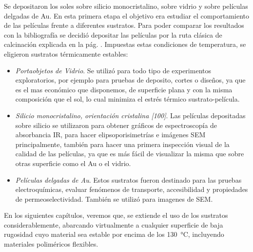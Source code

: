 	Se depositaron los soles sobre silicio monocristalino, sobre vidrio y sobre películas delgadas de Au. En esta primera etapa el objetivo era estudiar el comportamiento de las películas frente a diferentes sustratos. Para poder comparar los resultados con la bibliografía\cite{Soler-Illia2006,Brinker1990} se decidió depositar las películas por la ruta clásica de calcinación explicada en la pág. \pageref{sec:cond_y_extr}. Impuestas estas condiciones de temperatura, se eligieron sustratos térmicamente estables:
		\begin{itemize}

			\item \textit{Portaobjetos de Vidrio}. Se utilizó para todo tipo de experimentos exploratorios, por ejemplo para pruebas de deposito, cortes o diseños, ya que es el mas económico que disponemos, de superficie plana y con la misma composición que el sol, lo cual minimiza el estrés térmico sustrato-película.

			\item \textit{Silicio monocristalino, orientación cristalina [100]}. Las películas depositadas sobre silicio se utilizaron para obtener gráficos de espectroscopía de absorbancia IR, para hacer elipsoporisimetrías e imágenes SEM principalmente, también para hacer una primera inspección visual de la calidad de las películas, ya que es más fácil de visualizar la misma que sobre otras superficie como el Au o el vidrio. 

			\item \textit{Películas delgadas de Au}. Estos sustratos fueron destinado para las pruebas electroquímicas, evaluar fenómenos de transporte, accesibilidad y propiedades de permeoselectividad. También se utilizó para imagenes de SEM.

			\end{itemize}
	
	En los siguientes capítulos, veremos que, se extiende el uso de los sustratos considerablemente, abarcando virtualmente a cualquier superficie de baja rugosidad cuyo material sea estable por encima de los \SI{130}{\celsius}, incluyendo materiales poliméricos flexibles.
		

